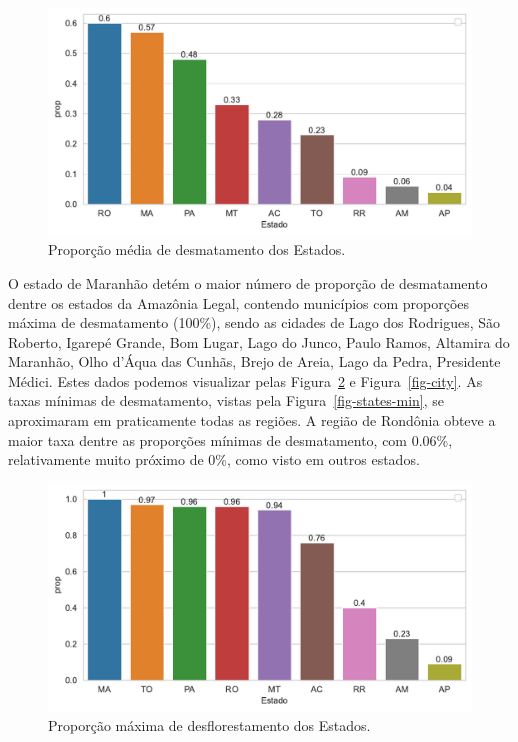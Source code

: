 \documentclass[
]{article}
\begin{document}
\begin{figure}[H]

{\centering \includegraphics{report_files/figure-pdf/fig-states-mean-output-1.pdf}

}

\caption{\label{fig-states-mean}Proporção média de desmatamento dos
Estados.}

\end{figure}

O estado de Maranhão detém o maior número de proporção de desmatamento
dentre os estados da Amazônia Legal, contendo municípios com proporções
máxima de desmatamento (100\%), sendo as cidades de Lago dos Rodrigues,
São Roberto, Igarepé Grande, Bom Lugar, Lago do Junco, Paulo Ramos,
Altamira do Maranhão, Olho d'Áqua das Cunhãs, Brejo de Areia, Lago da
Pedra, Presidente Médici. Estes dados podemos visualizar pelas
Figura~\ref{fig-states-max} e Figura~\ref{fig-city}. As taxas mínimas de
desmatamento, vistas pela Figura~\ref{fig-states-min}, se aproximaram em
praticamente todas as regiões. A região de Rondônia obteve a maior taxa
dentre as proporções mínimas de desmatamento, com 0.06\%, relativamente
muito próximo de 0\%, como visto em outros estados.

\begin{figure}[H]

{\centering \includegraphics{report_files/figure-pdf/fig-states-max-output-1.pdf}

}

\caption{\label{fig-states-max}Proporção máxima de desflorestamento dos
Estados.}

\end{figure}
\end{document}
